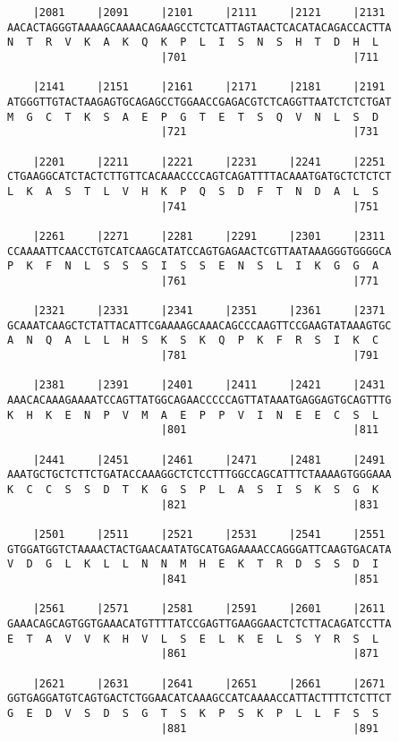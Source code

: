 \documentclass{article}
\begin{document}
\begin{Verbatim}
    |2081     |2091     |2101     |2111     |2121     |2131 
AACACTAGGGTAAAAGCAAAACAGAAGCCTCTCATTAGTAACTCACATACAGACCACTTA
N  T  R  V  K  A  K  Q  K  P  L  I  S  N  S  H  T  D  H  L  
                        |701                          |711  
  
    |2141     |2151     |2161     |2171     |2181     |2191 
ATGGGTTGTACTAAGAGTGCAGAGCCTGGAACCGAGACGTCTCAGGTTAATCTCTCTGAT
M  G  C  T  K  S  A  E  P  G  T  E  T  S  Q  V  N  L  S  D  
                        |721                          |731  
  
    |2201     |2211     |2221     |2231     |2241     |2251 
CTGAAGGCATCTACTCTTGTTCACAAACCCCAGTCAGATTTTACAAATGATGCTCTCTCT
L  K  A  S  T  L  V  H  K  P  Q  S  D  F  T  N  D  A  L  S  
                        |741                          |751  
  
    |2261     |2271     |2281     |2291     |2301     |2311 
CCAAAATTCAACCTGTCATCAAGCATATCCAGTGAGAACTCGTTAATAAAGGGTGGGGCA
P  K  F  N  L  S  S  S  I  S  S  E  N  S  L  I  K  G  G  A  
                        |761                          |771  
  
    |2321     |2331     |2341     |2351     |2361     |2371 
GCAAATCAAGCTCTATTACATTCGAAAAGCAAACAGCCCAAGTTCCGAAGTATAAAGTGC
A  N  Q  A  L  L  H  S  K  S  K  Q  P  K  F  R  S  I  K  C  
                        |781                          |791  
  
    |2381     |2391     |2401     |2411     |2421     |2431 
AAACACAAAGAAAATCCAGTTATGGCAGAACCCCCAGTTATAAATGAGGAGTGCAGTTTG
K  H  K  E  N  P  V  M  A  E  P  P  V  I  N  E  E  C  S  L  
                        |801                          |811  
  
    |2441     |2451     |2461     |2471     |2481     |2491 
AAATGCTGCTCTTCTGATACCAAAGGCTCTCCTTTGGCCAGCATTTCTAAAAGTGGGAAA
K  C  C  S  S  D  T  K  G  S  P  L  A  S  I  S  K  S  G  K  
                        |821                          |831  
  
    |2501     |2511     |2521     |2531     |2541     |2551 
GTGGATGGTCTAAAACTACTGAACAATATGCATGAGAAAACCAGGGATTCAAGTGACATA
V  D  G  L  K  L  L  N  N  M  H  E  K  T  R  D  S  S  D  I  
                        |841                          |851  
  
    |2561     |2571     |2581     |2591     |2601     |2611 
GAAACAGCAGTGGTGAAACATGTTTTATCCGAGTTGAAGGAACTCTCTTACAGATCCTTA
E  T  A  V  V  K  H  V  L  S  E  L  K  E  L  S  Y  R  S  L  
                        |861                          |871  
  
    |2621     |2631     |2641     |2651     |2661     |2671 
GGTGAGGATGTCAGTGACTCTGGAACATCAAAGCCATCAAAACCATTACTTTTCTCTTCT
G  E  D  V  S  D  S  G  T  S  K  P  S  K  P  L  L  F  S  S  
                        |881                          |891  
  

\end{Verbatim}
\end{document}
